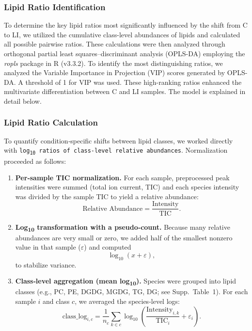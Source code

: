 \documentclass[10pt,letterpaper]{article}
\begin{document}
\subsubsection*{Lipid Ratio Identification}
To determine the key lipid ratios most significantly influenced by the shift from C to LI, we utilized the cumulative class-level abundances of lipids and calculated all possible pairwise ratios. These calculations were then analyzed through orthogonal partial least squares–discriminant analysis (OPLS-DA) employing the \emph{ropls} package in R (v3.3.2). To identify the most distinguishing ratios, we analyzed the Variable Importance in Projection (VIP) scores generated by OPLS-DA. A threshold of 1 for VIP was used. These high-ranking ratios enhanced the multivariate differentiation between C and LI samples. The model is explained in detail below. 

\subsubsection*{Lipid Ratio Calculation}

To quantify condition‐specific shifts between lipid classes, we worked directly with
\texttt{log\textsubscript{10} ratios of class‐level relative abundances}. Normalization proceeded as follows:

\begin{enumerate}
\item \textbf{Per‐sample TIC normalization.}  
For each sample, preprocessed peak intensities were summed (total ion current, TIC) and each species intensity was divided by the sample TIC to yield a relative abundance:
\[
\text{Relative Abundance} = \frac{\text{Intensity}}{\text{TIC}}.
\]

\item \textbf{Log\textsubscript{10} transformation with a pseudo‐count.}  
Because many relative abundances are very small or zero, we added half of the smallest nonzero value in that sample ($\varepsilon$) and computed 
\[
\log_{10}(x + \varepsilon),
\]
to stabilize variance.

\item \textbf{Class‐level aggregation (mean log\textsubscript{10}).}  
Species were grouped into lipid classes (e.g., PC, PE, DGDG, MGDG, TG, DG; see Supp.\ Table~1).  
For each sample $i$ and class $c$, we averaged the species‐level logs:
\[
\text{class\_log}_{i,c} = \frac{1}{n_c} \sum_{k \in c} \log_{10}\!\left(\frac{\text{Intensity}_{i,k}}{\text{TIC}_i} + \varepsilon_i\right).
\]
\end{enumerate}
\end{document}

